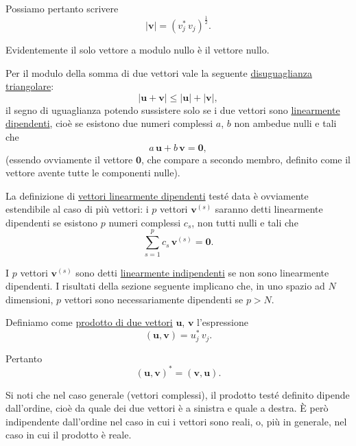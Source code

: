 \documentclass[11pt, a4paper]{book}
\numberwithin{equation}{section}
\begin{document}
Possiamo pertanto scrivere
\begin{equation}
    |\mathbf{v}| = \left( v_j^*\, v_j \right)^{\frac{1}{2}}.
    \tag{1b}
\end{equation}

Evidentemente il solo vettore a modulo nullo è il vettore nullo.

Per il modulo della somma di due vettori vale la seguente \underline{disuguaglianza triangolare}:
\begin{equation}
    |\mathbf{u} + \mathbf{v}| \leq |\mathbf{u}| + |\mathbf{v}|,
    \tag{2}
\end{equation}
il segno di uguaglianza potendo sussistere solo se i due vettori sono \underline{linearmente dipendenti}, cioè se esistono due numeri complessi $a$, $b$ non ambedue nulli e tali che
\begin{equation}
    a\,\mathbf{u} + b\,\mathbf{v} = \mathbf{0},
    \tag{2'}
\end{equation}
(essendo ovviamente il vettore $\mathbf{0}$, che compare a secondo membro, definito come il vettore avente tutte le componenti nulle).

La definizione di \underline{vettori linearmente dipendenti} testé data è ovviamente estendibile al caso di più vettori: i $p$ vettori $\mathbf{v}^{(s)}$ saranno detti linearmente dipendenti se esistono $p$ numeri complessi $c_s$, non tutti nulli e tali che
\[
    \sum_{s=1}^{p} c_s\, \mathbf{v}^{(s)} = \mathbf{0}.
\]

I $p$ vettori $\mathbf{v}^{(s)}$ sono detti \underline{linearmente indipendenti} se non sono linearmente dipendenti. I risultati della sezione seguente implicano che, in uno spazio ad $N$ dimensioni, $p$ vettori sono necessariamente dipendenti se $p > N$.

Definiamo come \underline{prodotto di due vettori} $\mathbf{u}$, $\mathbf{v}$ l'espressione
\begin{equation}
    (\mathbf{u}, \mathbf{v}) = u_j^*\, v_j.
    \tag{3}
\end{equation}

Pertanto
\begin{equation}
    (\mathbf{u}, \mathbf{v})^* = (\mathbf{v}, \mathbf{u}).
    \tag{4}
\end{equation}

Si noti che nel caso generale (vettori complessi), il prodotto testé definito dipende dall'ordine, cioè da quale dei due vettori è a sinistra e quale a destra. È però indipendente dall'ordine nel caso in cui i vettori sono reali, o, più in generale, nel caso in cui il prodotto è reale.
\end{document}
